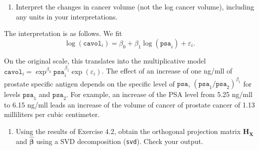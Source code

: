 \documentclass[]{book}
\newenvironment{Shaded}{\begin{snugshade}}{\end{snugshade}}
\newcommand{\KeywordTok}[1]{\textcolor[rgb]{0.13,0.29,0.53}{\textbf{#1}}}
\newcommand{\DataTypeTok}[1]{\textcolor[rgb]{0.13,0.29,0.53}{#1}}
\newcommand{\StringTok}[1]{\textcolor[rgb]{0.31,0.60,0.02}{#1}}
\newcommand{\CommentTok}[1]{\textcolor[rgb]{0.56,0.35,0.01}{\textit{#1}}}
\newcommand{\OtherTok}[1]{\textcolor[rgb]{0.56,0.35,0.01}{#1}}
\newcommand{\OperatorTok}[1]{\textcolor[rgb]{0.81,0.36,0.00}{\textbf{#1}}}
\newcommand{\NormalTok}[1]{#1}
\providecommand{\tightlist}{%
  \setlength{\itemsep}{0pt}\setlength{\parskip}{0pt}}
\theoremstyle{definition}
\theoremstyle{definition}
\theoremstyle{definition}
\theoremstyle{remark}
\begin{document}
\begin{enumerate}
\def\labelenumi{\alph{enumi}.}
\setcounter{enumi}{6}
\tightlist
\item
  Interpret the changes in cancer volume (not the log cancer volume),
  including any units in your interpretations.
\end{enumerate}

The interpretation is as follows. We fit
\[\log(\texttt{cavol}_i) = \beta_0 + \beta_1 \log(\texttt{psa}_i) + \varepsilon_i.\]

On the original scale, this translates into the multiplicative model
\(\texttt{cavol}_i= \exp^{\beta_0}\texttt{psa}_i^{\beta_1}\exp(\varepsilon_i)\).
The effect of an increase of one ng/mll of prostate specific antigen
depends on the specific level of \(\texttt{psa}\),
\((\texttt{psa}_1/\texttt{psa}_2)^{\beta_1}\) for levels
\(\texttt{psa}_1\) and \(\texttt{psa}_2\). For example, an increase of
the PSA level from 5.25 ng/mll to 6.15 ng/mll leads an increase of the
volume of cancer of prostate cancer of 1.13 milliliters per cubic
centimeter.

\begin{enumerate}
\def\labelenumi{\alph{enumi}.}
\setcounter{enumi}{7}
\tightlist
\item
  Using the results of Exercise 4.2, obtain the orthogonal projection
  matrix \(\mathbf{H}_{\mathbf{X}}\) and \(\hat{\boldsymbol{\beta}}\)
  using a SVD decomposition (\texttt{svd}). Check your output.
\end{enumerate}

\begin{Shaded}
\end{Shaded}
\end{document}
